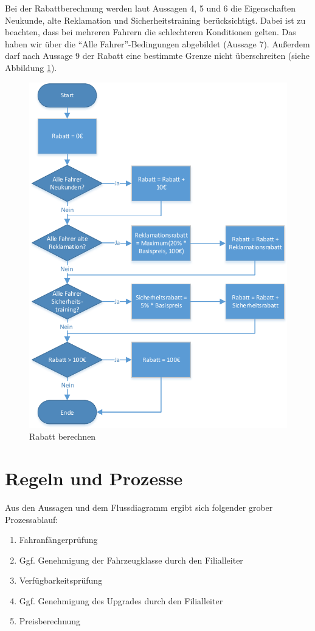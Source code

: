 Bei der Rabattberechnung werden laut Aussagen 4, 5 und 6 die Eigenschaften Neukunde, alte Reklamation
und Sicherheitstraining berücksichtigt. Dabei ist zu beachten, dass bei mehreren Fahrern die
schlechteren Konditionen gelten. Das haben wir über die "`Alle Fahrer"'-Bedingungen abgebildet (Aussage 7). Außerdem darf nach Aussage 9 der Rabatt eine bestimmte Grenze nicht überschreiten
(siehe Abbildung \ref{fig:Rabatt_berechnen}).

\begin{figure}[p]
	\centering
	\includegraphics[width=0.8\linewidth]{Bilder/Rabatt_berechnen}
	\caption{Rabatt berechnen}
	\label{fig:Rabatt_berechnen}
\end{figure}

\newpage
\section{Regeln und Prozesse}
\label{sec:rules}

Aus den Aussagen und dem Flussdiagramm ergibt sich folgender grober Prozessablauf:
\begin{enumerate}
	\item Fahranfängerprüfung
	\item Ggf. Genehmigung der Fahrzeugklasse durch den Filialleiter
	\item Verfügbarkeitsprüfung
	\item Ggf. Genehmigung des Upgrades durch den Filialleiter
	\item Preisberechnung
\end{enumerate}

